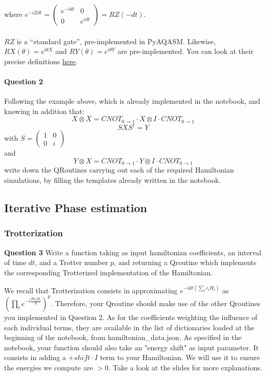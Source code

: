 \documentclass{article}
\begin{document}
where $e^{-iZdt} = \begin{pmatrix} e^{-idt} & 0 \\ 0 & e^{idt} \end{pmatrix} = RZ(-dt)$.

\paragraph{} $RZ$ is a ``standard gate'', pre-implemented in PyAQASM.
Likewise, $RX(\theta) = e^{i\theta X}$ and $RY(\theta)=e^{i\theta Y}$ are pre-implemented. You can look at their precise definitions
\textcolor{blue}{\href{https://myqlm.github.io/aqasm.html\#aqasm}{here}}.

\paragraph{Question 2} Following the example above, which is already implemented in the notebook, and knowing in addition that:
$$ X\otimes X = CNOT_{0\rightarrow 1} \cdot X\otimes I \cdot 
CNOT_{0\rightarrow 1}  $$
$$ SXS^{\dagger} = Y $$ with $S=\begin{pmatrix}1 & 0 \\ 0 & i \end{pmatrix}$ \\and 
$$ Y\otimes X = CNOT_{0\rightarrow 1} \cdot Y\otimes I \cdot 
CNOT_{0\rightarrow 1} $$
write down the QRoutines carrying out each of the required 
Hamiltonian simulations, by filling the templates already written
in the notebook. 

\subsection{Iterative Phase estimation}

\subsubsection{Trotterization}

\textbf{Question 3} Write a function taking as input hamiltonian
coefficients, an interval of time $dt$,  and a Trotter number $p$, 
and returning a Qroutine which implements the corresponding
Trotterized implementation of the Hamiltonian.

We recall that Trotterization consists in approximating $e^{-idt\left(\sum_{l}c_{l}H_{l}\right)}$ as
$\left(\prod_{l}e^{-i\frac{dt c_{l} H_{l}}{p}}\right)^{p}$. Therefore, your Qroutine should make use of
the other Qroutines you implemented in Question 2. As for the coefficients weighting the influence
of each individual terms, they are available in the list of dictionaries loaded at the beginning
of the notebook, from {\selectfont hamiltonian\_data.json}. As specified in the notebook,
your function should also take an "energy shift" as input parameter. It consists in adding a $+shift\cdot I$
term to your Hamiltonian. We will use it to ensure the energies we compute are $>0$. Take a look at the 
slides for more explanations.
\end{document}
